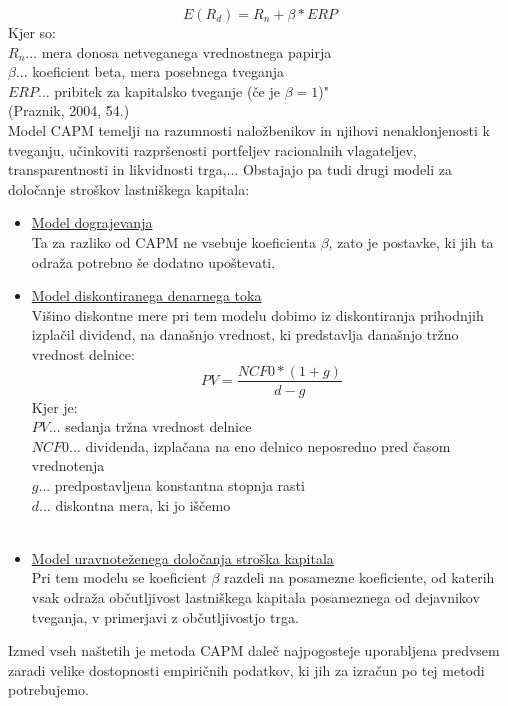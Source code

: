 \documentclass[12pt,a4paper]{amsart}
\theoremstyle{definition} %
\theoremstyle{plain} %
\begin{document}
\begin{equation}
E(R_d)=R_n+\beta*ERP
\end{equation}
Kjer so:\\
$R_n$... mera donosa netveganega vrednostnega papirja\\
$\beta$... koeficient beta, mera posebnega tveganja\\
$ERP$... pribitek za kapitalsko tveganje (če je $\beta=1$)"\\
(Praznik, 2004, 54.)\\
 Model CAPM temelji na razumnosti naložbenikov in njihovi nenaklonjenosti k tveganju, učinkoviti razpršenosti portfeljev racionalnih vlagateljev, transparentnosti in likvidnosti trga,... Obstajajo pa tudi drugi modeli za določanje stroškov lastniškega kapitala:
\begin{itemize}
\item \underline{Model dograjevanja}\\
Ta za razliko od CAPM ne vsebuje koeficienta $\beta$, zato je postavke, ki jih ta odraža potrebno še dodatno upoštevati.
\item \underline{Model diskontiranega denarnega toka}\\
Višino diskontne mere pri tem modelu dobimo iz diskontiranja prihodnjih izplačil dividend, na današnjo vrednost, ki predstavlja današnjo tržno vrednost delnice:
\begin{equation}
PV=\frac{NCF0*(1+g)}{d-g}
\end{equation}
Kjer je:\\
$PV$... sedanja tržna vrednost delnice\\
$NCF0$... dividenda, izplačana na eno delnico neposredno pred časom vrednotenja\\
$g$... predpostavljena konstantna stopnja rasti\\
$d$... diskontna mera, ki jo iščemo\\
\\
\item \underline{Model uravnoteženega določanja stroška kapitala}\\
Pri tem modelu se koeficient $\beta$ razdeli na posamezne koeficiente, od katerih vsak odraža občutljivost lastniškega kapitala posameznega od dejavnikov tveganja, v primerjavi z občutljivostjo trga.
\end{itemize}
Izmed vseh naštetih je metoda CAPM daleč najpogosteje uporabljena predvsem zaradi velike dostopnosti empiričnih podatkov, ki jih za izračun po tej metodi potrebujemo.
\end{document}
